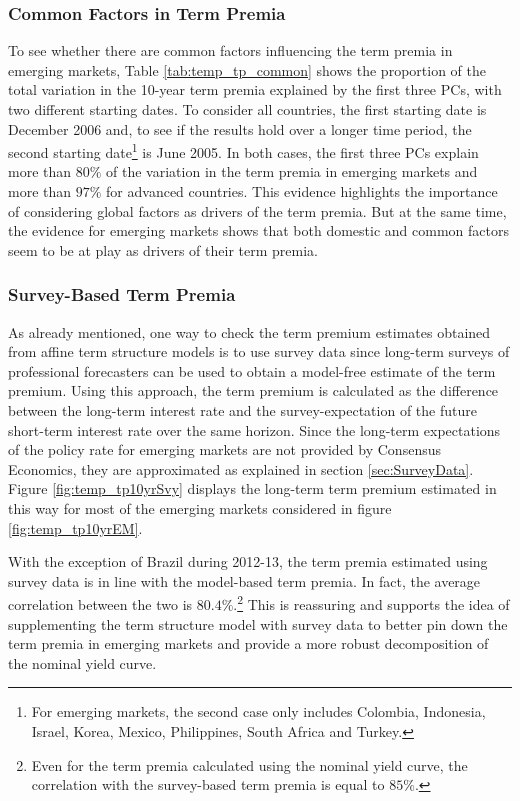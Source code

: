 \subsubsection{Common Factors in Term Premia}
To see whether there are common factors influencing the term premia in emerging markets, Table \ref{tab:temp_tp_common} shows the proportion of the total variation in the 10-year term premia explained by the first three PCs, with two different starting dates. To consider all countries, the first starting date is December 2006 and, to see if the results hold over a longer time period, the second starting date\footnote{For emerging markets, the second case only includes Colombia, Indonesia, Israel, Korea, Mexico, Philippines, South Africa and Turkey.} is June 2005. In both cases, the first three PCs explain more than $80\%$ of the variation in the term premia in emerging markets and more than $97\%$ for advanced countries. This evidence highlights the importance of considering global factors as drivers of the term premia. But at the same time, the evidence for emerging markets shows that both domestic and common factors seem to be at play as drivers of their term premia.
%	
%	
	

\subsubsection{Survey-Based Term Premia}
As already mentioned, one way to check the term premium estimates obtained from affine term structure models is to use survey data since long-term surveys of professional forecasters can be used to obtain a model-free estimate of the term premium. Using this approach, the term premium is calculated as the difference between the long-term interest rate and the survey-expectation of the future short-term interest rate over the same horizon. Since the long-term expectations of the policy rate for emerging markets are not provided by Consensus Economics, they are approximated as explained in section \ref{sec:SurveyData}. Figure \ref{fig:temp_tp10yrSvy} displays the long-term term premium estimated in this way for most of the emerging markets considered in figure \ref{fig:temp_tp10yrEM}.
	

With the exception of Brazil during 2012-13, the term premia estimated using survey data is in line with the model-based term premia. In fact, the average correlation between the two is $80.4\%$.\footnote{Even for the term premia calculated using the nominal yield curve, the correlation with the survey-based term premia is equal to $85\%$.} This is reassuring and supports the idea of supplementing the term structure model with survey data to better pin down the term premia in emerging markets and provide a more robust decomposition of the nominal yield curve.


